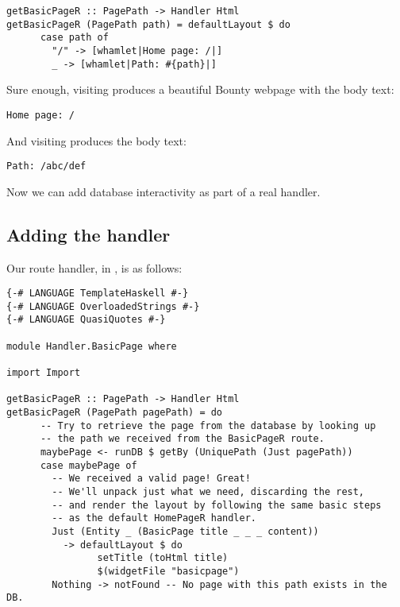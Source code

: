 \begin{Verbatim}[samepage=true]
getBasicPageR :: PagePath -> Handler Html
getBasicPageR (PagePath path) = defaultLayout $ do
      case path of
        "/" -> [whamlet|Home page: /|]
        _ -> [whamlet|Path: #{path}|]
\end{Verbatim}

Sure enough, visiting  produces a beautiful Bounty webpage with the body text:

\begin{Verbatim}[samepage=true]
Home page: /
\end{Verbatim}

And visiting  produces the body text:

\begin{Verbatim}[samepage=true]
Path: /abc/def
\end{Verbatim}

Now we can add database interactivity as part of a real handler.

\subsection{Adding the handler}

Our route handler, in , is as follows:

\begin{Verbatim}[samepage=true]
{-# LANGUAGE TemplateHaskell #-}
{-# LANGUAGE OverloadedStrings #-}
{-# LANGUAGE QuasiQuotes #-}

module Handler.BasicPage where

import Import

getBasicPageR :: PagePath -> Handler Html
getBasicPageR (PagePath pagePath) = do
      -- Try to retrieve the page from the database by looking up
      -- the path we received from the BasicPageR route.
      maybePage <- runDB $ getBy (UniquePath (Just pagePath))
      case maybePage of
        -- We received a valid page! Great!
        -- We'll unpack just what we need, discarding the rest,
        -- and render the layout by following the same basic steps
        -- as the default HomePageR handler.
        Just (Entity _ (BasicPage title _ _ _ content)) 
          -> defaultLayout $ do
                setTitle (toHtml title)
                $(widgetFile "basicpage")
        Nothing -> notFound -- No page with this path exists in the DB.
\end{Verbatim}


